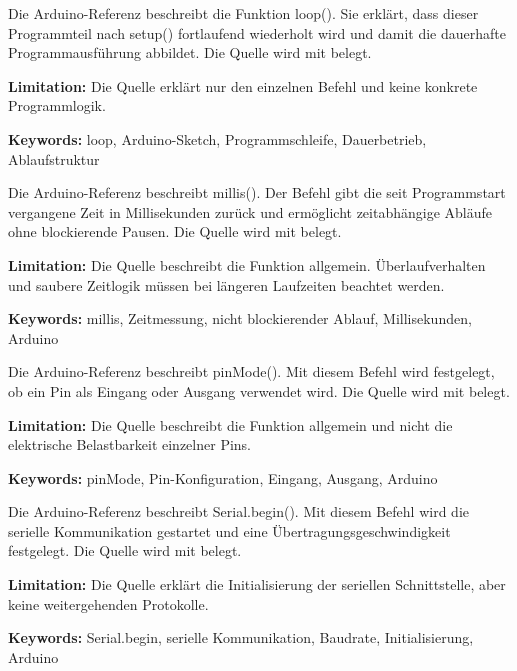 
{ 
	Die Arduino-Referenz beschreibt die Funktion loop(). Sie erklärt, dass dieser Programmteil nach setup() fortlaufend wiederholt wird und damit die dauerhafte Programmausführung abbildet. Die Quelle wird mit \cite{arduino_loop} belegt.
	
	\bigskip
	
	\textbf{Limitation:} Die Quelle erklärt nur den einzelnen Befehl und keine konkrete Programmlogik.
	
	\scriptsize{\textbf{Keywords:} loop, Arduino-Sketch, Programmschleife, Dauerbetrieb, Ablaufstruktur}
}



{ 
	Die Arduino-Referenz beschreibt millis(). Der Befehl gibt die seit Programmstart vergangene Zeit in Millisekunden zurück und ermöglicht zeitabhängige Abläufe ohne blockierende Pausen. Die Quelle wird mit \cite{arduino_millis} belegt.
	
	\bigskip
	
	\textbf{Limitation:} Die Quelle beschreibt die Funktion allgemein. Überlaufverhalten und saubere Zeitlogik müssen bei längeren Laufzeiten beachtet werden.
	
	\scriptsize{\textbf{Keywords:} millis, Zeitmessung, nicht blockierender Ablauf, Millisekunden, Arduino}
}



{ 
	Die Arduino-Referenz beschreibt pinMode(). Mit diesem Befehl wird festgelegt, ob ein Pin als Eingang oder Ausgang verwendet wird. Die Quelle wird mit \cite{arduino_pinmode} belegt.
	
	\bigskip
	
	\textbf{Limitation:} Die Quelle beschreibt die Funktion allgemein und nicht die elektrische Belastbarkeit einzelner Pins.
	
	\scriptsize{\textbf{Keywords:} pinMode, Pin-Konfiguration, Eingang, Ausgang, Arduino}
}



{ 
	Die Arduino-Referenz beschreibt Serial.begin(). Mit diesem Befehl wird die serielle Kommunikation gestartet und eine Übertragungsgeschwindigkeit festgelegt. Die Quelle wird mit \cite{arduino_serialbegin} belegt.
	
	\bigskip
	
	\textbf{Limitation:} Die Quelle erklärt die Initialisierung der seriellen Schnittstelle, aber keine weitergehenden Protokolle.
	
	\scriptsize{\textbf{Keywords:} Serial.begin, serielle Kommunikation, Baudrate, Initialisierung, Arduino}
}


